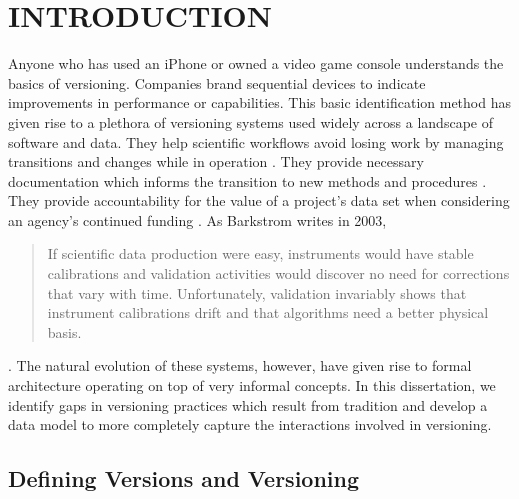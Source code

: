 
\chapter{INTRODUCTION}

Anyone who has used an iPhone or owned a video game console understands the basics of versioning.
Companies brand sequential devices to indicate improvements in performance or capabilities.
This basic identification method has given rise to a plethora of versioning systems used widely across a landscape of software and data.
They help scientific workflows avoid losing work by managing transitions and changes while in operation \cite{Casati1996}.
They provide necessary documentation which informs the transition to new methods and procedures \cite{Wiil:2000:RDH:338407.338517}.
They provide accountability for the value of a project's data set when considering an agency's continued funding \cite{Cavanaugh2002}.
As Barkstrom writes in 2003,
\begin{quotation}
	If scientific data production were easy, instruments would
	have stable calibrations and validation activities would discover no need for
	corrections that vary with time. Unfortunately, validation invariably shows that
	instrument calibrations drift and that algorithms need a better physical basis.
\end{quotation} \cite{Barkstrom2003}.
The natural evolution of these systems, however, have given rise to formal architecture operating on top of very informal concepts.
In this dissertation, we identify gaps in versioning practices which result from tradition and develop a data model to more completely capture the interactions involved in versioning.

\section{Defining Versions and Versioning}


